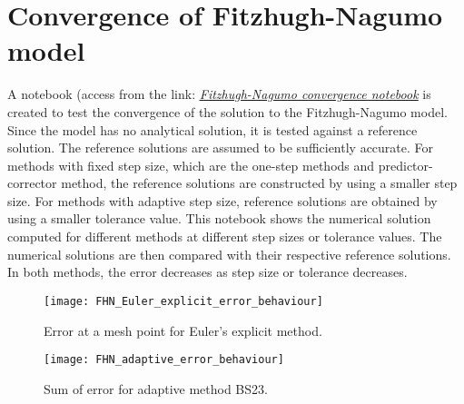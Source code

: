 \section{Convergence of Fitzhugh-Nagumo model}
\label{sec:FHN-convergence}
A notebook (access from the link: \href{https://nbviewer.jupyter.org/github/FarmHJ/numerical-solver/blob/main/examples/fhn_model_convergence.ipynb}{\underline{\emph{Fitzhugh-Nagumo convergence notebook}}} is created to test the convergence of the solution to the Fitzhugh-Nagumo model. Since the model has no analytical solution, it is tested against a reference solution. The reference solutions are assumed to be sufficiently accurate. For methods with fixed step size, which are the one-step methods and predictor-corrector method, the reference solutions are constructed by using a smaller step size. For methods with adaptive step size, reference solutions are obtained by using a smaller tolerance value. This notebook shows the numerical solution computed for different methods at different step sizes or tolerance values. The numerical solutions are then compared with their respective reference solutions. In both methods, the error decreases as step size or tolerance decreases.

\begin{figure}
    \texttt{[image: FHN\_Euler\_explicit\_error\_behaviour]}
    \caption{Error at a mesh point for Euler's explicit method.}
    \label{fig:Euler_explicit_error}
 \end{figure}
\begin{figure}
   \texttt{[image: FHN\_adaptive\_error\_behaviour]}
   \caption{Sum of error for adaptive method BS23.}
   \label{fig:adaptive_error}
\end{figure}